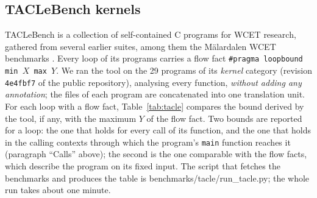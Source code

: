 \documentclass[oneside,english]{amsart}
\numberwithin{equation}{section}
\numberwithin{figure}{section}
\theoremstyle{plain}
\theoremstyle{definition}
\theoremstyle{plain}
\theoremstyle{remark}
\theoremstyle{plain}
\theoremstyle{definition}
\theoremstyle{plain}
\theoremstyle{remark}
\newcommand{\lean}[1]{{\ttfamily\small #1}}
\begin{document}
\subsection{TACLeBench kernels}
\label{subsec:tacle}

TACLeBench \cite{falk2016taclebench} is a collection of self-contained C programs for WCET research, gathered from several earlier suites, among them the M\"alardalen WCET benchmarks \cite{gustafsson2010malardalen}. Every loop of its programs carries a flow fact \texttt{\#pragma loopbound min $X$ max $Y$}. We ran the tool on the 29 programs of its \emph{kernel} category (revision \texttt{4e4fbf7} of the public repository), analysing every function, \emph{without adding any annotation}; the files of each program are concatenated into one translation unit. For each loop with a flow fact, Table~\ref{tab:tacle} compares the bound derived by the tool, if any, with the maximum $Y$ of the flow fact. Two bounds are reported for a loop: the one that holds for every call of its function, and the one that holds in the calling contexts through which the program's \texttt{main} function reaches it (paragraph ``Calls'' above); the second is the one comparable with the flow facts, which describe the program on its fixed input. The script that fetches the benchmarks and produces the table is \lean{benchmarks/tacle/run\_tacle.py}; the whole run takes about one minute.
\end{document}
